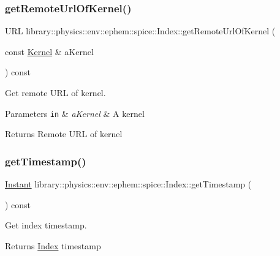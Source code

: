 \subsubsection{\texorpdfstring{get\+Remote\+Url\+Of\+Kernel()}{getRemoteUrlOfKernel()}}
{\footnotesize\ttfamily U\+RL library\+::physics\+::env\+::ephem\+::spice\+::\+Index\+::get\+Remote\+Url\+Of\+Kernel (\begin{DoxyParamCaption}\item[{const \hyperlink{classlibrary_1_1physics_1_1env_1_1ephem_1_1spice_1_1_kernel}{Kernel} \&}]{a\+Kernel }\end{DoxyParamCaption}) const}



Get remote U\+RL of kernel. 


\begin{DoxyParams}[1]{Parameters}
\mbox{\tt in}  & {\em a\+Kernel} & A kernel \\
\hline
\end{DoxyParams}
\begin{DoxyReturn}{Returns}
Remote U\+RL of kernel 
\end{DoxyReturn}
\mbox{\label{classlibrary_1_1physics_1_1env_1_1ephem_1_1spice_1_1_index_a76685c1763f2733504dc9ad62350c846}} 
\subsubsection{\texorpdfstring{get\+Timestamp()}{getTimestamp()}}
{\footnotesize\ttfamily \hyperlink{classlibrary_1_1physics_1_1time_1_1_instant}{Instant} library\+::physics\+::env\+::ephem\+::spice\+::\+Index\+::get\+Timestamp (\begin{DoxyParamCaption}{ }\end{DoxyParamCaption}) const}



Get index timestamp. 

\begin{DoxyReturn}{Returns}
\hyperlink{classlibrary_1_1physics_1_1env_1_1ephem_1_1spice_1_1_index}{Index} timestamp 
\end{DoxyReturn}
\mbox{\label{classlibrary_1_1physics_1_1env_1_1ephem_1_1spice_1_1_index_afca3a26311c0f33d6ae4e84d47732ef0}} 
